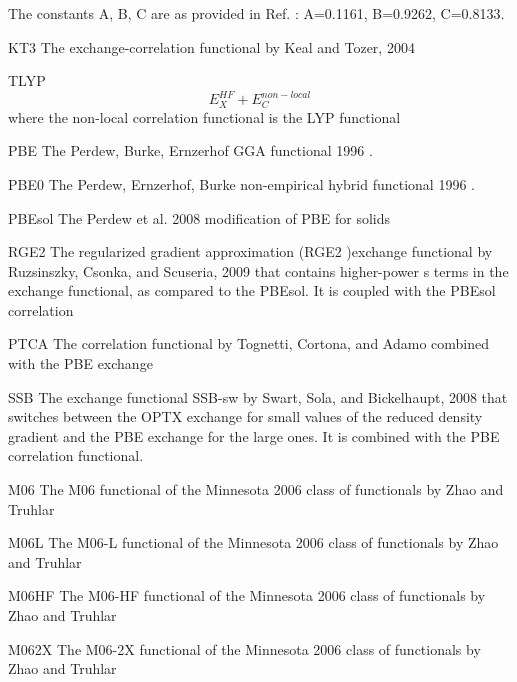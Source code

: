 \begin{keywordlist}
The constants A, B, C are as provided in Ref. \cite{O3LYP} :  A=0.1161, B=0.9262, C=0.8133.
\item[KT3]
The exchange-correlation functional by Keal and Tozer, 2004 \cite{KT2,KT3}
\item[TLYP]
\begin{equation}
 E_X ^{HF} + E_C ^{non-local}
\end{equation}
where the non-local correlation functional is the LYP functional
\item[PBE]
The Perdew, Burke, Ernzerhof GGA functional 1996 \cite{PBE:96}.
\item[PBE0]
The Perdew, Ernzerhof, Burke non-empirical hybrid functional 1996 \cite{PBE0:96}.
\item[PBEsol]
The Perdew et al. 2008 modification of PBE for solids
\item[RGE2]
The regularized gradient approximation (RGE2 )exchange functional by Ruzsinszky, Csonka, and Scuseria, 2009 that contains
higher-power s terms in the exchange functional, as compared to the PBEsol. It is coupled with the PBEsol correlation \cite{RGE2}
\item[PTCA]
The correlation functional by Tognetti, Cortona, and Adamo combined with the PBE exchange  \cite{TCA}
\item[SSB]
The exchange functional SSB-sw by Swart, Sola, and Bickelhaupt, 2008  \cite{SSB} that switches between the OPTX exchange
for small values of the reduced density gradient and the PBE exchange for the large ones. It is combined with the PBE correlation functional.
\item[M06]
The M06 functional of the Minnesota 2006 class of functionals by Zhao and Truhlar \cite{ZT1,ZT2,ZT3,ZT4}
\item[M06L]
The M06-L functional of the Minnesota 2006 class of functionals by Zhao and Truhlar \cite{ZT1,ZT2,ZT3,ZT4}
\item[M06HF]
The M06-HF functional of the Minnesota 2006 class of functionals by Zhao and Truhlar \cite{ZT1,ZT2,ZT3,ZT4}
\item[M062X]
The M06-2X functional of the Minnesota 2006 class of functionals by Zhao and Truhlar \cite{ZT1,ZT2,ZT3,ZT4}
\end{keywordlist}
